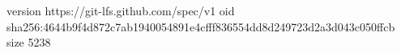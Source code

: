version https://git-lfs.github.com/spec/v1
oid sha256:4644b9f4d872c7ab1940054891e4cfff836554dd8d249723d2a3d043c050ffcb
size 5238
